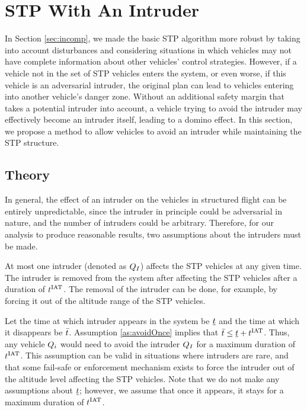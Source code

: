 \section{STP With An Intruder \label{sec:intruder}}
In Section \ref{sec:incomp}, we made the basic STP algorithm more robust by taking into account disturbances and considering situations in which vehicles may not have complete information about other vehicles' control strategies. However, if a vehicle not in the set of STP vehicles enters the system, or even worse, if this vehicle is an adversarial intruder, the original plan can lead to vehicles entering into another vehicle's danger zone. Without an additional safety margin that takes a potential intruder into account, a vehicle trying to avoid the intruder may effectively become an intruder itself, leading to a domino effect. In this section, we propose a method to allow vehicles to avoid an intruder while maintaining the STP structure.
\vspace{-0.1cm}
\subsection{Theory}
In general, the effect of an intruder on the vehicles in structured flight can be entirely unpredictable, since the intruder in principle could be adversarial in nature, and the number of intruders could be arbitrary. Therefore, for our analysis to produce reasonable results, two assumptions about the intruders must be made.

\begin{assumption}
\label{as:avoidOnce}
At most one intruder (denoted as $Q_I$) affects the STP vehicles at any given time. The intruder is removed from the system after affecting the STP vehicles after a duration of $t^\text{IAT}$. The removal of the intruder can be done, for example, by forcing it out of the altitude range of the STP vehicles.
\end{assumption}

Let the time at which intruder appears in the system be $\underline{t}$ and the time at which it disappears be $\bar{t}$. Assumption \ref{as:avoidOnce} implies that $\bar{t} \leq \underline{t} + t^\text{IAT}$. Thus, any vehicle $Q_i$ would need to avoid the intruder $Q_{I}$ for a maximum duration of $t^\text{IAT}$. This assumption can be valid in situations where intruders are rare, and that some fail-safe or enforcement mechanism exists to force the intruder out of the altitude level affecting the STP vehicles. Note that we do not make any assumptions about $\underline{t}$; however, we assume that once it appears, it stays for a maximum duration of $t^\text{IAT}$.

